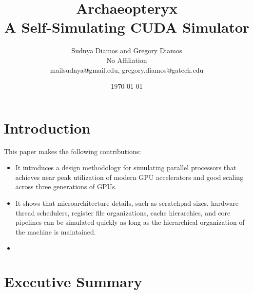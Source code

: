 \documentclass[conference, 12pt]{IEEEtran}
\begin{document}
 

\title{Archaeopteryx\\
A Self-Simulating CUDA Simulator}

\author{Sudnya Diamos and Gregory Diamos  \\
No Affiliation \\
{\small mailsudnya@gmail.edu, gregory.diamos@gatech.edu}}
\date{\today}

\maketitle

\section{Introduction}



This paper makes the following contributions:

\begin{itemize}
	\item It introduces a design methodology for simulating parallel processors
		that achieves near peak utilization of modern GPU accelerators and
		good scaling across three generations of GPUs.
		
	\item It shows that microarchitecture details, such as scratchpad sizes,
		hardware thread schedulers, register file organizations, cache
		hierarchies, and core pipelines can be simulated quickly as long as
		the hierarchical organization of the machine is maintained.
	
	\item 
\end{itemize}


\section{Executive Summary}
\end{document}

